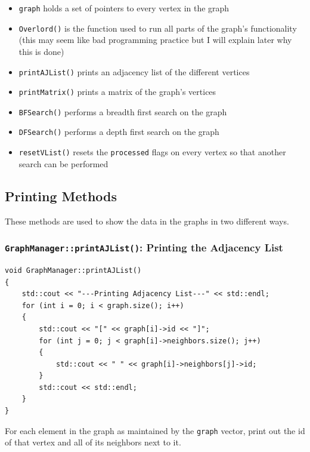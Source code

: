 \documentclass[letterpaper, 10pt]{article}
\begin{document}
\begin{itemize}
    \item \texttt{graph} holds a set of pointers to every vertex in the graph
    \item \texttt{Overlord()} is the function used to run all parts of the graph's functionality (this may seem like bad programming practice but I will explain later why this is done)
    \item \texttt{printAJList()} prints an adjacency list of the different vertices
    \item \texttt{printMatrix()} prints a matrix of the graph's vertices
    \item \texttt{BFSearch()} performs a breadth first search on the graph
    \item \texttt{DFSearch()} performs a depth first search on the graph
    \item \texttt{resetVList()} resets the \texttt{processed} flags on every vertex so that another search can be performed
\end{itemize}
\newpage
\subsection{Printing Methods}


These methods are used to show the data in the graphs in two different ways.

\subsubsection{\texttt{GraphManager::printAJList()}: Printing the Adjacency List}



\begin{addmargin}[-5em]{1em}
\begin{small}
\begin{verbatim}
void GraphManager::printAJList()
{
	std::cout << "---Printing Adjacency List---" << std::endl;
	for (int i = 0; i < graph.size(); i++)
	{
		std::cout << "[" << graph[i]->id << "]";
		for (int j = 0; j < graph[i]->neighbors.size(); j++)
		{
			std::cout << " " << graph[i]->neighbors[j]->id;
		}
		std::cout << std::endl;
	}
}
\end{verbatim}
\end{small}
\end{addmargin}

For each element in the graph as maintained by the \texttt{graph} vector, print out the id of that vertex and all of its neighbors next to it.
\end{document}
